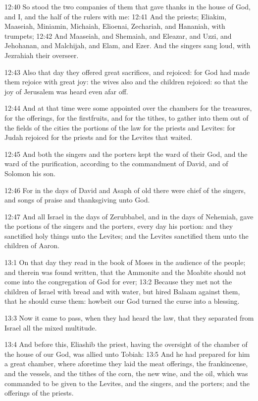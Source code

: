 12:40 So stood the two companies of them that gave thanks in the house
of God, and I, and the half of the rulers with me: 12:41 And the
priests; Eliakim, Maaseiah, Miniamin, Michaiah, Elioenai, Zechariah,
and Hananiah, with trumpets; 12:42 And Maaseiah, and Shemaiah, and
Eleazar, and Uzzi, and Jehohanan, and Malchijah, and Elam, and Ezer.
And the singers sang loud, with Jezrahiah their overseer.

12:43 Also that day they offered great sacrifices, and rejoiced: for
God had made them rejoice with great joy: the wives also and the
children rejoiced: so that the joy of Jerusalem was heard even afar
off.

12:44 And at that time were some appointed over the chambers for the
treasures, for the offerings, for the firstfruits, and for the tithes,
to gather into them out of the fields of the cities the portions of
the law for the priests and Levites: for Judah rejoiced for the
priests and for the Levites that waited.

12:45 And both the singers and the porters kept the ward of their God,
and the ward of the purification, according to the commandment of
David, and of Solomon his son.

12:46 For in the days of David and Asaph of old there were chief of
the singers, and songs of praise and thanksgiving unto God.

12:47 And all Israel in the days of Zerubbabel, and in the days of
Nehemiah, gave the portions of the singers and the porters, every day
his portion: and they sanctified holy things unto the Levites; and the
Levites sanctified them unto the children of Aaron.

13:1 On that day they read in the book of Moses in the audience of the
people; and therein was found written, that the Ammonite and the
Moabite should not come into the congregation of God for ever; 13:2
Because they met not the children of Israel with bread and with water,
but hired Balaam against them, that he should curse them: howbeit our
God turned the curse into a blessing.

13:3 Now it came to pass, when they had heard the law, that they
separated from Israel all the mixed multitude.

13:4 And before this, Eliashib the priest, having the oversight of the
chamber of the house of our God, was allied unto Tobiah: 13:5 And he
had prepared for him a great chamber, where aforetime they laid the
meat offerings, the frankincense, and the vessels, and the tithes of
the corn, the new wine, and the oil, which was commanded to be given
to the Levites, and the singers, and the porters; and the offerings of
the priests.

